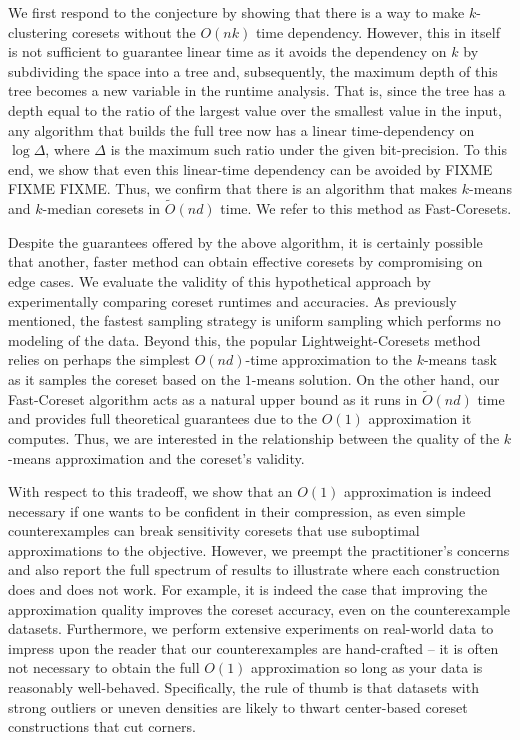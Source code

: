 We first respond to the conjecture by showing that there is a way to make $k$-clustering coresets without the $O(nk)$ time dependency. However, this in
itself is not sufficient to guarantee linear time as it avoids the dependency on $k$ by subdividing the space into a tree and, subsequently, the
maximum depth of this tree becomes a new variable in the runtime analysis. That is, since the tree has a depth equal to the ratio of the largest value over
the smallest value in the input, any algorithm that builds the full tree now has a linear time-dependency on $\log \Delta$, where $\Delta$ is the maximum
such ratio under the given bit-precision. To this end, we show that even this linear-time dependency can be avoided by FIXME FIXME FIXME. Thus, we
confirm that there is an algorithm that makes $k$-means and $k$-median coresets in $\tilde{O}(nd)$ time. We refer to this method as Fast-Coresets.

Despite the guarantees offered by the above algorithm, it is certainly possible that another, faster method can obtain effective coresets by compromising on
edge cases. We evaluate the validity of this hypothetical approach by experimentally comparing coreset runtimes and accuracies. As previously
mentioned, the fastest sampling strategy is uniform sampling which performs no modeling of the data. Beyond this, the popular Lightweight-Coresets method relies
on perhaps the simplest $O(nd)$-time approximation to the $k$-means task as it samples the coreset based on the $1$-means solution.
On the other hand, our Fast-Coreset algorithm acts as a natural upper bound as it runs in $\tilde{O}(nd)$ time and provides full theoretical guarantees due to
the $O(1)$ approximation it computes. Thus, we are interested in the relationship between the quality of the $k$-means approximation and the coreset's validity.

With respect to this tradeoff, we show that an $O(1)$ approximation is indeed necessary if one wants to be confident in their compression, as even simple
counterexamples can break sensitivity coresets that use suboptimal approximations to the objective. However, we preempt the practitioner's concerns and also report
the full spectrum of results to illustrate where each construction does and does not work. For example, it is indeed the case that improving the approximation
quality improves the coreset accuracy, even on the counterexample datasets. Furthermore, we perform extensive experiments on real-world data to impress upon the
reader that our counterexamples are hand-crafted -- it is often not necessary to obtain the full $O(1)$ approximation so long as your data is reasonably
well-behaved. Specifically, the rule of thumb is that datasets with strong outliers or uneven densities are likely to thwart center-based coreset
constructions that cut corners.

